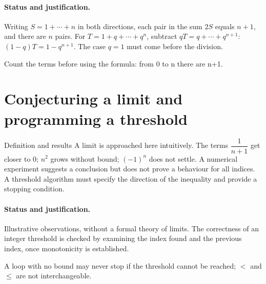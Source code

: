 \paragraph{Status and justification.} Writing $S=1+\cdots+n$ in both directions, each pair in the sum $2S$ equals $n+1$, and there are $n$ pairs. For $T=1+q+\cdots+q^n$, subtract $qT=q+\cdots+q^{n+1}$: $(1-q)T=1-q^{n+1}$. The case $q=1$ must come before the division.
\label{C01-EX4}
\begin{erreur}Count the terms before using the formula: from 0 to n there are n+1.\end{erreur}
\label{C01-AP4}
\section{Conjecturing a limit and programming a threshold}\label{C01-U5}
\begin{repere}{Definition and results}
A limit is approached here intuitively. The terms $\dfrac{1}{n+1}$ get closer to 0; $n^2$ grows without bound; $(-1)^n$ does not settle. A numerical experiment suggests a conclusion but does not prove a behaviour for all indices. A threshold algorithm must specify the direction of the inequality and provide a stopping condition.
\end{repere}
\paragraph{Status and justification.} Illustrative observations, without a formal theory of limits. The correctness of an integer threshold is checked by examining the index found and the previous index, once monotonicity is established.
\label{C01-EX5}
\begin{erreur}A loop with no bound may never stop if the threshold cannot be reached; $<$ and $\leq$ are not interchangeable.\end{erreur}
\label{C01-AP5}
